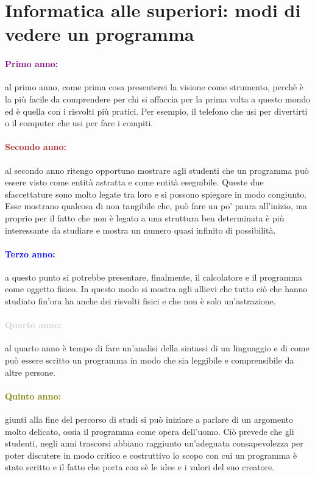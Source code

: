 \section{Informatica alle superiori: modi di vedere un programma}

\paragraph{\textcolor{purple}{Primo anno:}} al primo anno, come prima cosa
presenterei la visione come strumento, perchè è la più facile da comprendere
per chi si affaccia per la prima volta a questo mondo ed è quella con i risvolti
più pratici. Per esempio, il telefono che usi per divertirti o il computer che usi
per fare i compiti.

\paragraph{\textcolor{brown}{Secondo anno:}} al secondo anno ritengo opportuno
mostrare agli studenti che un programma può essere visto come entità astratta e
come entità eseguibile. Queste due sfaccettature sono molto legate tra loro e
si possono spiegare in modo congiunto. Esse mostrano qualcosa di non tangibile che,
può fare un po' paura all'inizio, ma proprio per il fatto che non è legato a una struttura
ben determinata è più interessante da studiare e mostra un numero quasi infinito di
possibilità. 

\paragraph{\textcolor{blue}{Terzo anno:}} a questo punto si potrebbe presentare,
finalmente, il calcolatore e il programma come oggetto fisico. In questo modo
si mostra agli allievi che tutto ciò che hanno studiato fin'ora ha anche dei risvolti
fisici e che non è solo un'astrazione.
 
\paragraph{\textcolor{lightgray}{Quarto anno:}} al quarto anno è tempo di
fare un'analisi della sintassi di un linguaggio e di come può essere scritto
un programma in modo che sia leggibile e comprensibile da altre persone.

\paragraph{\textcolor{olive}{Quinto anno:}} giunti alla fine del percorso
di studi si può iniziare a parlare di un argomento molto delicato, ossia
il programma come opera dell'uomo. Ciò prevede che gli studenti, negli anni
trascorsi abbiano raggiunto un'adeguata consapevolezza per poter discutere in
modo critico e costruttivo lo scopo con cui un programma è stato scritto e
il fatto che porta con sè le idee e i valori del suo creatore.
